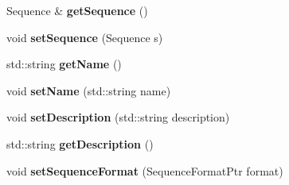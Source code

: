 \begin{DoxyCompactItemize}
\item 
\mbox{\label{classtops_1_1SequenceEntry_ace5e4a7debdaaaa9e310ee4089b18eb8}} 
Sequence \& {\bfseries get\+Sequence} ()
\item 
\mbox{\label{classtops_1_1SequenceEntry_ad6d909a0d36aa86a4e4dd212baee9e05}} 
void {\bfseries set\+Sequence} (Sequence s)
\item 
\mbox{\label{classtops_1_1SequenceEntry_a82b88e7245367e742b1c6534b18c874f}} 
std\+::string {\bfseries get\+Name} ()
\item 
\mbox{\label{classtops_1_1SequenceEntry_a7592040add18af5c75e05840426f8ccd}} 
void {\bfseries set\+Name} (std\+::string name)
\item 
\mbox{\label{classtops_1_1SequenceEntry_ad3b4a503cb643fb0d6d1a579d7a2bcda}} 
void {\bfseries set\+Description} (std\+::string description)
\item 
\mbox{\label{classtops_1_1SequenceEntry_ab681ffbe26d9effe0368b517f794d4d6}} 
std\+::string {\bfseries get\+Description} ()
\item 
\mbox{\label{classtops_1_1SequenceEntry_af04a5ec6737223cc67613096755ef671}} 
void {\bfseries set\+Sequence\+Format} (Sequence\+Format\+Ptr format)
\end{DoxyCompactItemize}
